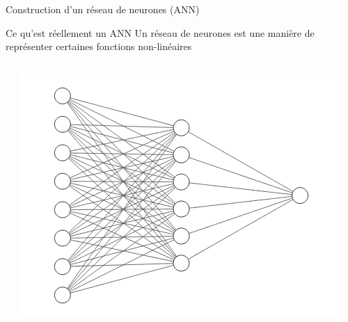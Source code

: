 \documentclass[10pt,xcolor={x11names}]{beamer}
\begin{document}
\begin{frame}{Construction d'un réseau de neurones (ANN)}
	\begin{block}{Ce qu'est réellement un ANN}
		Un réseau de neurones est une manière de représenter certaines fonctions non-linéaires
	\end{block}

	\begin{columns}
		\begin{flushright}
		\end{flushright}
		\includegraphics[width=\textwidth]{nnet.png}
	\end{columns}
\end{frame}
\end{document}
